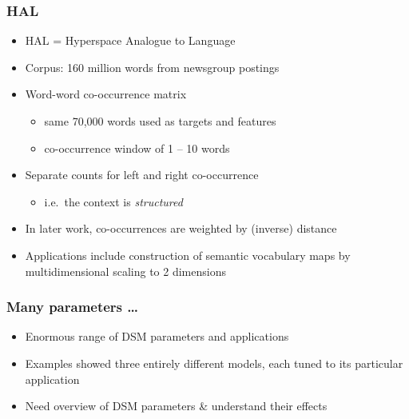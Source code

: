 \begin{frame}
  \frametitle{HAL \citep{Lund:Burgess:96}}

  \begin{itemize}
  \item HAL = Hyperspace Analogue to Language
  \item Corpus: 160 million words from newsgroup postings
  \item Word-word co-occurrence matrix
    \begin{itemize}
    \item same 70,000 words used as targets and features
    \item co-occurrence window of 1 -- 10 words
    \end{itemize}
  \item Separate counts for left and right co-occurrence
    \begin{itemize}
    \item i.e.\ the context is \emph{structured}
    \end{itemize}
  \item In later work, co-occurrences are weighted by (inverse) distance \citep{Li:Burgess:Lund:00}
  \item Applications include construction of semantic vocabulary maps
    by multidimensional scaling to 2 dimensions
  \end{itemize}
\end{frame}

\begin{frame}
  \frametitle{Many parameters \ldots}

  \begin{itemize}
  \item Enormous range of DSM parameters and applications
  \item Examples showed three entirely different models, each tuned to
    its particular application
  \item[\So] Need overview of DSM parameters \& understand their effects
  \end{itemize}
\end{frame}


